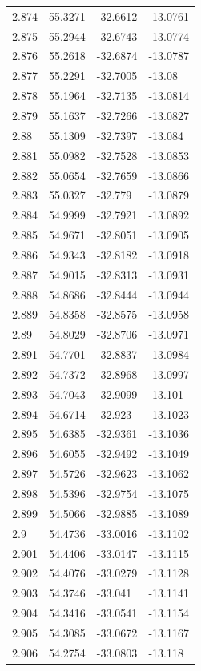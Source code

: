 \begin{tabular}{llll}
2.874 & 55.3271 & -32.6612 & -13.0761 \\
2.875 & 55.2944 & -32.6743 & -13.0774 \\
2.876 & 55.2618 & -32.6874 & -13.0787 \\
2.877 & 55.2291 & -32.7005 & -13.08 \\
2.878 & 55.1964 & -32.7135 & -13.0814 \\
2.879 & 55.1637 & -32.7266 & -13.0827 \\
2.88 & 55.1309 & -32.7397 & -13.084 \\
2.881 & 55.0982 & -32.7528 & -13.0853 \\
2.882 & 55.0654 & -32.7659 & -13.0866 \\
2.883 & 55.0327 & -32.779 & -13.0879 \\
2.884 & 54.9999 & -32.7921 & -13.0892 \\
2.885 & 54.9671 & -32.8051 & -13.0905 \\
2.886 & 54.9343 & -32.8182 & -13.0918 \\
2.887 & 54.9015 & -32.8313 & -13.0931 \\
2.888 & 54.8686 & -32.8444 & -13.0944 \\
2.889 & 54.8358 & -32.8575 & -13.0958 \\
2.89 & 54.8029 & -32.8706 & -13.0971 \\
2.891 & 54.7701 & -32.8837 & -13.0984 \\
2.892 & 54.7372 & -32.8968 & -13.0997 \\
2.893 & 54.7043 & -32.9099 & -13.101 \\
2.894 & 54.6714 & -32.923 & -13.1023 \\
2.895 & 54.6385 & -32.9361 & -13.1036 \\
2.896 & 54.6055 & -32.9492 & -13.1049 \\
2.897 & 54.5726 & -32.9623 & -13.1062 \\
2.898 & 54.5396 & -32.9754 & -13.1075 \\
2.899 & 54.5066 & -32.9885 & -13.1089 \\
2.9 & 54.4736 & -33.0016 & -13.1102 \\
2.901 & 54.4406 & -33.0147 & -13.1115 \\
2.902 & 54.4076 & -33.0279 & -13.1128 \\
2.903 & 54.3746 & -33.041 & -13.1141 \\
2.904 & 54.3416 & -33.0541 & -13.1154 \\
2.905 & 54.3085 & -33.0672 & -13.1167 \\
2.906 & 54.2754 & -33.0803 & -13.118 \\

\end{tabular}
